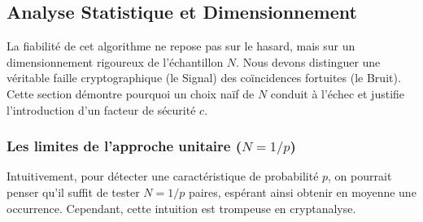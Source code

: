 \documentclass{article}
\begin{document}
    \begin{algorithm}[H]
        \caption{Recherche Différentielle Standard (Naïve Optimisée)}


    \end{algorithm}

    \subsection{Analyse Statistique et Dimensionnement}

    La fiabilité de cet algorithme ne repose pas sur le hasard, mais sur un dimensionnement rigoureux de l'échantillon $N$. Nous devons distinguer une véritable faille cryptographique (le Signal) des coïncidences fortuites (le Bruit). Cette section démontre pourquoi un choix naïf de $N$ conduit à l'échec et justifie l'introduction d'un facteur de sécurité $c$.

    \subsubsection{Les limites de l'approche unitaire ($N=1/p$)}

    Intuitivement, pour détecter une caractéristique de probabilité $p$, on pourrait penser qu'il suffit de tester $N = 1/p$ paires, espérant ainsi obtenir en moyenne une occurrence. Cependant, cette intuition est trompeuse en cryptanalyse.
\end{document}

